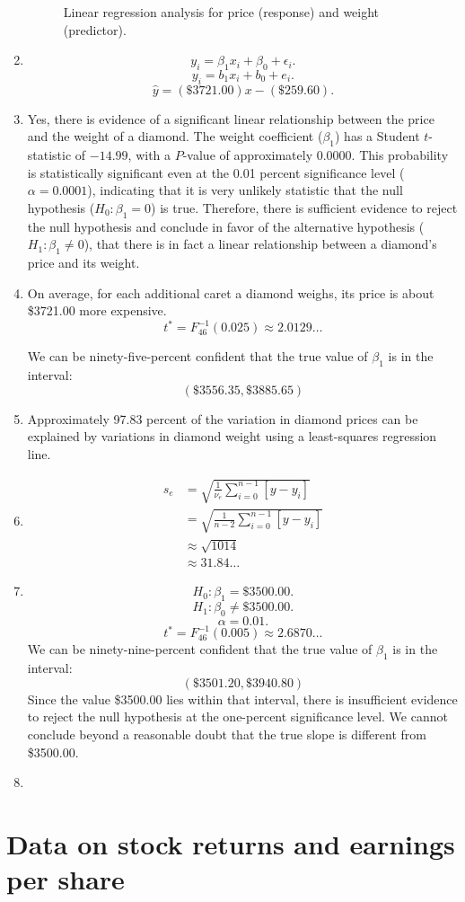 \documentclass[12pt]{article}
\begin{document}
\begin{enumerate}
\begin{figure}
\begin{center}
\end{center}
\caption{Linear regression analysis for price (response) and weight (predictor).\label{fig:priceweightregression}}
\end{figure}
\item\[y_i=\beta_1x_i+\beta_0+\epsilon_i.\]
\[y_i=b_1x_i+b_0+e_i.\]
\[\hat{y}=(\$3721.00)x-(\$259.60).\]
\item Yes, there is evidence of a significant linear relationship between the price and the weight of a diamond. The weight coefficient ($\beta_1$) has a Student $t$-statistic of $-14.99$, with a $P$-value of approximately 0.0000. This probability is statistically significant even at the 0.01 percent significance level ($\alpha=0.0001$), indicating that it is very unlikely statistic that the null hypothesis ($H_0:\beta_1=0$) is true. Therefore, there is sufficient evidence to reject the null hypothesis and conclude in favor of the alternative hypothesis ($H_1:\beta_1\neq 0$), that there is in fact a linear relationship between a diamond's price and its weight.
\item On average, for each additional caret a diamond weighs, its price is about \$3721.00 more expensive.
\[t^*=F^{-1}_{46}(0.025)\approx 2.0129\dots\]

We can be ninety-five-percent confident that the true value of $\beta_1$ is in the interval:
\[(\$3556.35,\$3885.65)\]
\item Approximately 97.83 percent of the variation in diamond prices can be explained by variations in diamond weight using a least-squares regression line.
\item\begin{align*}
s_e
&=\sqrt{\frac{1}{\nu_e}\sum^{n-1}_{i=0}{[y-y_i]}}\\
&=\sqrt{\frac{1}{n-2}\sum^{n-1}_{i=0}{[y-y_i]}}\\
&\approx\sqrt{1014}\\
&\approx 31.84\dots
\end{align*}
\item\[H_0:\beta_1=\$3500.00.\]
\[H_1:\beta_0\neq\$3500.00.\]
\[\alpha=0.01.\]
\[t^*=F^{-1}_{46}(0.005)\approx 2.6870\dots\]
We can be ninety-nine-percent confident that the true value of $\beta_1$ is in the interval:
\[(\$3501.20,\$3940.80)\]
Since the value \$3500.00 lies within that interval, there is insufficient evidence to reject the null hypothesis at the one-percent significance level. We cannot conclude beyond a reasonable doubt that the true slope is different from \$3500.00.
\item 
\end{enumerate}
\section{Data on stock returns and earnings per share}
\end{document}
